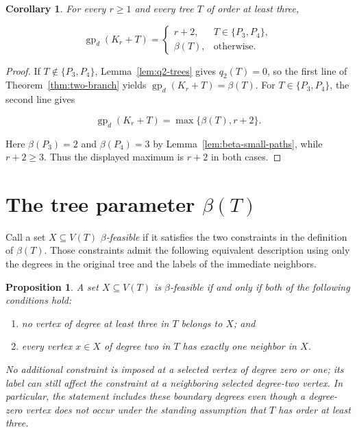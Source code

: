 \documentclass[preprint,12pt]{elsarticle}
\providecommand{\tightlist}{%
  \setlength{\itemsep}{0pt}\setlength{\parskip}{0pt}}
\newtheorem{corollary}[theorem]{Corollary}
\newtheorem{proposition}[theorem]{Proposition}
\numberwithin{equation}{section}
\begin{document}
\begin{corollary}\label{cor:main-formula}
For every \(r\ge 1\) and every tree \(T\) of
order at least three,

\[
\operatorname{gp}_d(K_r+T)=
\begin{cases}
r+2,&T\in\{P_3,P_4\},\\
\beta(T),&\text{otherwise}.
\end{cases}
\]
\end{corollary}

\begin{proof}
If \(T\notin\{P_3,P_4\}\), Lemma~\ref{lem:q2-trees} gives \(q_2(T)=0\),
so the first line of Theorem~\ref{thm:two-branch} yields
\(\operatorname{gp}_d(K_r+T)=\beta(T)\). For \(T\in\{P_3,P_4\}\), the
second line gives

\[
\operatorname{gp}_d(K_r+T)=\max\{\beta(T),r+2\}.
\]

Here \(\beta(P_3)=2\) and \(\beta(P_4)=3\) by Lemma~\ref{lem:beta-small-paths}, while
\(r+2\ge 3\). Thus the displayed maximum is \(r+2\) in both cases.
\end{proof}

\section{The tree parameter \texorpdfstring{$\beta(T)$}{beta(T)}}\label{sec:beta}

Call a set \(X\subseteq V(T)\) \emph{\(\beta\)-feasible} if it satisfies
the two constraints in the definition of \(\beta(T)\). Those constraints
admit the following equivalent description using only the degrees in the
original tree and the labels of the immediate neighbors.

\begin{proposition}\label{prop:local-characterization}
A set \(X\subseteq V(T)\) is
\(\beta\)-feasible if and only if both of the following conditions hold:

\begin{enumerate}
\def\labelenumi{\arabic{enumi}.}
\tightlist
\item
  no vertex of degree at least three in \(T\) belongs to \(X\); and
\item
  every vertex \(x\in X\) of degree two in \(T\) has exactly one
  neighbor in \(X\).
\end{enumerate}

No additional constraint is imposed at a selected vertex of degree zero
or one; its label can still affect the constraint at a neighboring
selected degree-two vertex.
In particular, the statement includes these boundary degrees even though
a degree-zero vertex does not occur under the standing assumption that
\(T\) has order at least three.
\end{proposition}
\end{document}
